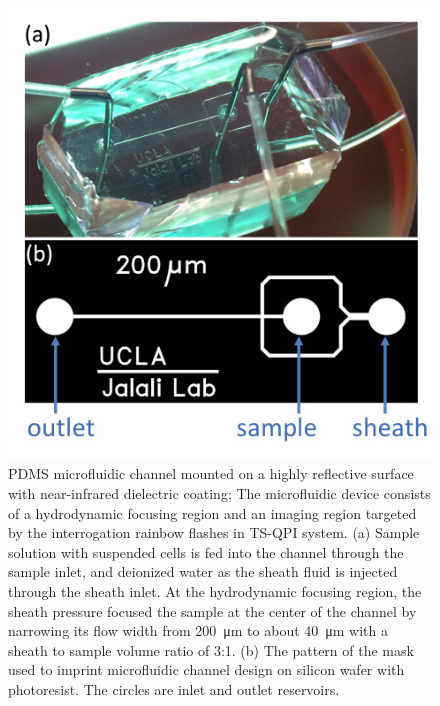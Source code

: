 \documentclass[aps,pra,reprint,longbibliography,groupedaddress]{revtex4-1}
\begin{document}
\begin{figure}
\includegraphics[scale=0.2]{FigureChannel.jpg}
\caption{\label{fig:Channel} PDMS microfluidic channel mounted on a highly reflective surface with near-infrared dielectric coating; The microfluidic device consists of a hydrodynamic focusing region and an imaging region targeted by the interrogation rainbow flashes in TS-QPI system. (a) Sample solution with suspended cells is fed into the channel through the sample inlet, and deionized water as the sheath fluid is injected through the sheath inlet. At the hydrodynamic focusing region, the sheath pressure focused the sample at the center of the channel by narrowing its flow width from \SI{200}{\micro\meter} to about \SI{40}{\micro\meter} with a sheath to sample volume ratio of 3:1. (b) The pattern of the mask used to imprint microfluidic channel design on silicon wafer with photoresist. The circles are inlet and outlet reservoirs.}
\end{figure}
\end{document}
